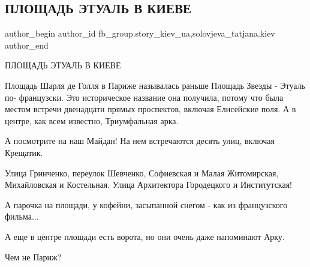  
 
 
 
 
 
\subsection{ПЛОЩАДЬ ЭТУАЛЬ В КИЕВЕ}
\label{sec:30_01_2022.fb.fb_group.story_kiev_ua.2.ploschad_etual_v_kieve}
 
\ifcmt
 author_begin
   author_id fb_group.story_kiev_ua,solovjeva_tatjana.kiev
 author_end
\fi

ПЛОЩАДЬ ЭТУАЛЬ В КИЕВЕ

Площадь Шарля де Голля в Париже называлась раньше Площадь Звезды - Этуаль по-
французски. Это историческое название она получила, потому что была местом
встречи двенадцати прямых проспектов, включая Елисейские поля. А в центре, как
всем известно, Триумфальная арка.


А посмотрите на наш Майдан! На нем встречаются десять улиц, включая Крещатик.


Улица Гринченко, переулок Шевченко, Софиевская и Малая Житомирская,
Михайловская и Костельная. Улица Архитектора Городецкого и Институтская!

А парочка на площади, у кофейни, засыпанной снегом - как из французского
фильма...

А еще в центре площади есть ворота, но они очень даже напоминают Арку.

Чем не Париж?

\raggedcolumns
\begin{multicols}{3} %
\setlength{\parindent}{0pt}



\end{multicols} %

